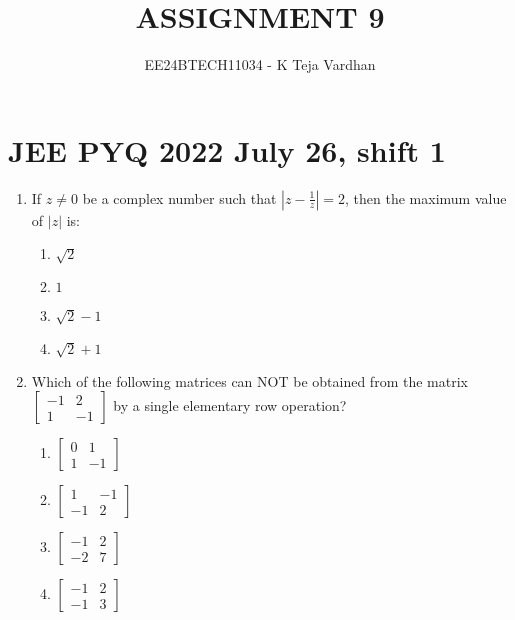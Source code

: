 \documentclass[journal]{IEEEtran}
\newcommand{\abs}[1]{\left| #1 \right|}
\begin{document}

\title{ASSIGNMENT 9}
\author{EE24BTECH11034 - K Teja Vardhan}
{\let\newpage\relax\maketitle}

\section{JEE PYQ 2022 July 26, shift 1}
\begin{enumerate}

    \item If $z\ne0$ be a complex number such that $\abs{z-\frac{1}{z}}=2$, then the maximum value of $\abs{z}$ is:
    
        \begin{multicols}{4}
        \begin{enumerate}
        \item $\sqrt{2}$
        \item $1$
        \item $\sqrt{2}-1$
        \item $\sqrt{2}+1$
        \end{enumerate}
        \end{multicols}

    \item Which of the following matrices can NOT be obtained from the matrix $\begin{bmatrix}-1 & 2 \\ 1 & -1\end{bmatrix}$ by a single elementary row operation?

        \begin{multicols}{4}
        \begin{enumerate}
        \item $\begin{bmatrix}0 & 1 \\ 1 & -1\end{bmatrix}$
        \item $\begin{bmatrix}1 & -1 \\ -1 & 2\end{bmatrix}$
        \item $\begin{bmatrix}-1 & 2 \\ -2 & 7\end{bmatrix}$
        \item $\begin{bmatrix}-1 & 2 \\ -1 & 3\end{bmatrix}$
        \end{enumerate}
        \end{multicols}


\end{enumerate}
\end{document}
